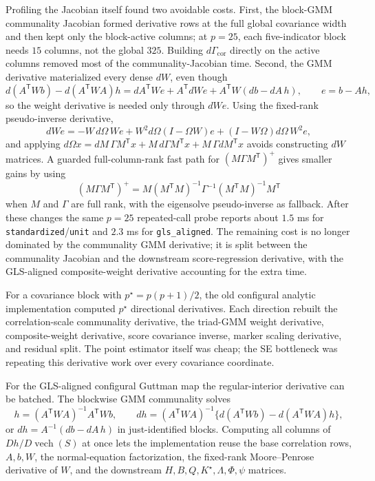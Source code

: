 \documentclass[11pt]{article}
\newcommand{\T}{^{\mathsf T}}
\newcommand{\vech}{\operatorname{vech}}
\theoremstyle{plain}
\theoremstyle{remark}
\begin{document}
Profiling the Jacobian itself found two avoidable costs. First, the block-GMM
communality Jacobian formed derivative rows at the full global covariance width
and then kept only the block-active columns; at \(p=25\), each five-indicator
block needs \(15\) columns, not the global \(325\). Building
\(d\Gamma_{\mathrm{cor}}\) directly on the active columns removed most of the
communality-Jacobian time. Second, the GMM derivative materialized every dense
\(dW\), even though
\[
  d(A\T Wb)-d(A\T W A)h
    =
  dA\T W e + A\T dW e + A\T W(db-dA\,h),
  \qquad e=b-Ah,
\]
so the weight derivative is needed only through \(dW e\). Using the fixed-rank
pseudo-inverse derivative,
\[
  dW e =
  -W\,d\Omega\,We
  +W^2 d\Omega (I-\Omega W)e
  +(I-W\Omega)d\Omega\,W^2e,
\]
and applying \(d\Omega x=dM\,\Gamma M\T x+M\,d\Gamma M\T x+
M\,\Gamma dM\T x\) avoids constructing \(dW\) matrices. A guarded
full-column-rank fast path for \((M\Gamma M\T)^+\) gives smaller gains by using
\[
  (M\Gamma M\T)^+ =
  M(M\T M)^{-1}\Gamma^{-1}(M\T M)^{-1}M\T
\]
when \(M\) and \(\Gamma\) are full rank, with the eigensolve pseudo-inverse as
fallback. After these changes the same \(p=25\) repeated-call probe reports
about \(1.5\) ms for \texttt{standardized}/\texttt{unit} and \(2.3\) ms for
\texttt{gls\_aligned}. The remaining cost is no longer dominated by the
communality GMM derivative; it is split between the communality Jacobian and the
downstream score-regression derivative, with the GLS-aligned composite-weight
derivative accounting for the extra time.

For a covariance block with \(p^\star=p(p+1)/2\), the old configural analytic
implementation computed \(p^\star\) directional derivatives. Each direction
rebuilt the correlation-scale communality derivative, the triad-GMM weight
derivative, composite-weight derivative, score covariance inverse, marker
scaling derivative, and residual split. The point estimator itself was cheap;
the SE bottleneck was repeating this derivative work over every covariance
coordinate.

For the GLS-aligned configural Guttman map the regular-interior derivative can
be batched. The blockwise GMM communality solves
\[
  h=(A\T W A)^{-1}A\T Wb,\qquad
  dh=(A\T W A)^{-1}\{d(A\T Wb)-d(A\T W A)h\},
\]
or \(dh=A^{-1}(db-dA\,h)\) in just-identified blocks. Computing all columns of
\(Dh/D\vech(S)\) at once lets the implementation reuse the base correlation
rows, \(A,b,W\), the normal-equation factorization, the fixed-rank
Moore--Penrose derivative of \(W\), and the downstream
\(H,B,Q,K^\star,\Lambda,\Phi,\psi\) matrices.
\end{document}
